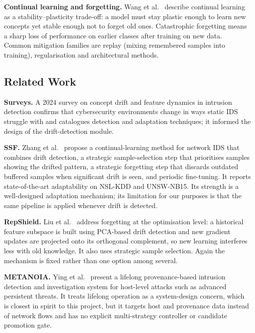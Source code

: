 \documentclass{article}
\begin{document}
\textbf{Continual learning and forgetting.} Wang et al.\ \cite{wang2024cl} describe continual learning as a stability--plasticity trade-off: a model must stay plastic enough to learn new concepts yet stable enough not to forget old ones. Catastrophic forgetting means a sharp loss of performance on earlier classes after training on new data. Common mitigation families are replay (mixing remembered samples into training), regularisation and architectural methods.

\subsection{Related Work}

\textbf{Surveys.} A 2024 survey on concept drift and feature dynamics in intrusion detection \cite{evolving2024survey} confirms that cybersecurity environments change in ways static IDS struggle with and catalogues detection and adaptation techniques; it informed the design of the drift-detection module.

\textbf{SSF.} Zhang et al.\ \cite{zhang2024ssf} propose a continual-learning method for network IDS that combines drift detection, a strategic sample-selection step that prioritises samples showing the drifted pattern, a strategic forgetting step that discards outdated buffered samples when significant drift is seen, and periodic fine-tuning. It reports state-of-the-art adaptability on NSL-KDD and UNSW-NB15. Its strength is a well-designed adaptation mechanism; its limitation for our purposes is that the same pipeline is applied whenever drift is detected.

\textbf{RepShield.} Liu et al.\ \cite{liu2026repshield} address forgetting at the optimisation level: a historical feature subspace is built using PCA-based drift detection and new gradient updates are projected onto its orthogonal complement, so new learning interferes less with old knowledge. It also uses strategic sample selection. Again the mechanism is fixed rather than one option among several.

\textbf{METANOIA.} Ying et al.\ \cite{ying2025metanoia} present a lifelong provenance-based intrusion detection and investigation system for host-level attacks such as advanced persistent threats. It treats lifelong operation as a system-design concern, which is closest in spirit to this project, but it targets host and provenance data instead of network flows and has no explicit multi-strategy controller or candidate promotion gate.
\end{document}
